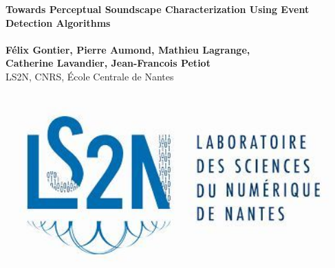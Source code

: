 \documentclass[a0,portrait]{a0poster}
\begin{document}


\begin{minipage}[b]{0.75\linewidth}
\veryHuge \color{NavyBlue} \textbf{Towards Perceptual Soundscape Characterization Using\- Event Detection Algorithms} \color{Black}\\ %
\Huge\textit{}\\[2cm] %
\huge \textbf{F\'elix Gontier, Pierre Aumond, Mathieu Lagrange,\\ Catherine Lavandier, Jean-Francois Petiot}\\[0.5cm] %
\huge LS2N, CNRS, \'Ecole Centrale de Nantes\\[0.4cm] %
\end{minipage}
%
\begin{minipage}[b]{0.25\linewidth}
\includegraphics[width=20cm]{logoLs2n.jpg}\\
\end{minipage}

\vspace{1cm} %

\end{document}
